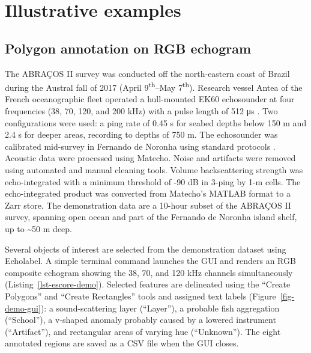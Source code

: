 \documentclass[
  number,
  preprint,
  3p]{elsarticle}
\begin{document}
\section{Illustrative examples}\label{illustrative-examples}

\subsection{Polygon annotation on RGB
echogram}\label{polygon-annotation-on-rgb-echogram}

The ABRAÇOS II survey was conducted off the north-eastern coast of
Brazil during the Austral fall of 2017 (April 9\textsuperscript{th}--May
7\textsuperscript{th}). Research vessel Antea of the French
oceanographic fleet operated a hull-mounted EK60 echosounder at four
frequencies (38, 70, 120, and 200 kHz) with a pulse length of 512 μs
\citep{abracos2cruise, bertrand2026}. Two configurations were used: a
ping rate of 0.45 s for seabed depths below 150 m and 2.4 s for deeper
areas, recording to depths of 750 m. The echosounder was calibrated
mid-survey in Fernando de Noronha using standard protocols
\citep{demer2015}. Acoustic data were processed using Matecho. Noise and
artifacts were removed using automated and manual cleaning tools. Volume
backscattering strength was echo-integrated with a minimum threshold of
-90 dB in 3-ping by 1-m cells. The echo-integrated product was converted
from Matecho's MATLAB format to a Zarr store. The demonstration data are
a 10-hour subset of the ABRAÇOS II survey, spanning open ocean and part
of the Fernando de Noronha island shelf, up to \textasciitilde50 m deep.

Several objects of interest are selected from the demonstration dataset
using Echolabel. A simple terminal command launches the GUI and renders
an RGB composite echogram showing the 38, 70, and 120 kHz channels
simultaneously (Listing~\ref{lst-escore-demo}). Selected features are
delineated using the ``Create Polygons'' and ``Create Rectangles'' tools
and assigned text labels (Figure~\ref{fig-demo-gui}): a sound-scattering
layer (``Layer''), a probable fish aggregation (``School''), a v-shaped
anomaly probably caused by a lowered instrument (``Artifact''), and
rectangular areas of varying hue (``Unknown''). The eight annotated
regions are saved as a CSV file when the GUI closes.
\end{document}
